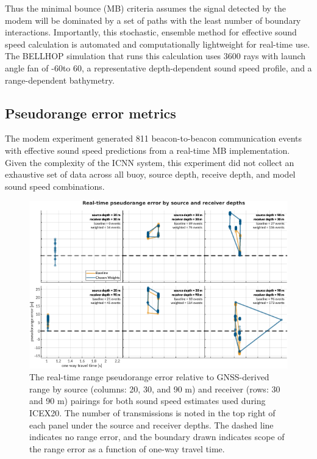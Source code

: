 \documentclass[preprint,TurnOnLineNumbers]{JASA}
\newcommand{\llabel}[1]{\hypertarget{llineno:#1}{\linelabel{#1}}}
\begin{document}
Thus the minimal bounce (MB) criteria assumes the signal detected by the modem will be dominated by a set of paths with the least number of boundary interactions.
Importantly, this stochastic, ensemble method for effective sound speed calculation is automated and computationally lightweight for real-time use.
The BELLHOP simulation that runs this calculation uses 3600 rays with launch angle fan of -60\textdegree to 60\textdegree, a representative depth-dependent sound speed profile, and a range-dependent bathymetry. \llabel{1.13}

\subsection{Pseudorange error metrics}

The modem experiment generated 811 beacon-to-beacon communication events with effective sound speed predictions from a real-time MB implementation.
Given the complexity of the ICNN system, this experiment did not collect an exhaustive set of data across all buoy, source depth, receive depth, and model sound speed combinations.

\begin{figure}[!ht]
  \centering
  \includegraphics[width=\columnwidth]{Fig5.pdf}
  \caption{The real-time range pseudorange error relative to GNSS-derived range by source (columns: 20, 30, and 90 m) and receiver (rows: 30 and 90 m) pairings for both sound speed estimates used during ICEX20. The number of transmissions is noted in the top right of each panel under the source and receiver depths. The dashed line indicates no range error, and the boundary drawn indicates scope of the range error as a function of one-way travel time.}
  \label{fig:range-error-insitu}
\end{figure}
\end{document}
